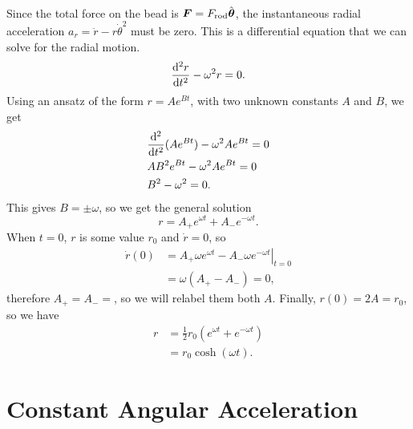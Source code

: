 \documentclass[../classical_mechanics.tex]{subfiles}
\begin{document}
\begin{example}
            \paragraph{}
            Since the total force on the bead is $\boldsymbol{F}=F_\text{rod}\hat{\boldsymbol{\theta}}$, the instantaneous radial acceleration $a_r=\ddot{r}-r\dot{\theta}^2$ must be zero.
            This is a differential equation that we can solve for the radial motion.
            \begin{equation}
                \dv[2]{r}{t}-\omega^2r=0.
            \end{equation}
            Using an ansatz of the form $r=Ae^{Bt}$, with two unknown constants $A$ and $B$, we get
            \begin{align}
                &\dv[2]{}{t}(Ae^{Bt})-\omega^2Ae^{Bt}=0\\
                &AB^2e^{Bt}-\omega^2Ae^{Bt}=0\\
                &B^2-\omega^2=0.
            \end{align}
            This gives $B=\pm\omega$, so we get the general solution
            \begin{equation}
                r=A_+e^{\omega t}+A_-e^{-\omega t}.
            \end{equation}
            When $t=0$, $r$ is some value $r_0$ and $\dot{r}=0$, so
            \begin{align}
                \dot{r}(0)&=\left.A_+\omega e^{\omega t}-A_-\omega e^{-\omega t}\right|_{t=0}\\
                &=\omega(A_+-A_-)=0,
            \end{align}
            therefore $A_+=A_-=$, so we will relabel them both $A$.
            Finally, $r(0)=2A=r_0$, so we have
            \begin{align}
                r&=\frac{1}{2}r_0(e^{\omega t}+e^{-\omega t})\\
                &=r_0\cosh(\omega t).
            \end{align}
        \end{example}

    \section{Constant Angular Acceleration}\label{sec:constant-angular-acceleration}
\end{document}

